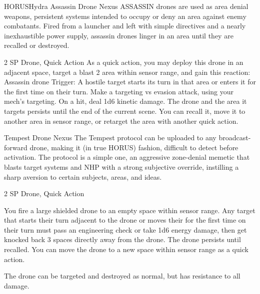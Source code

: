 \begin{mech}{HORUS}{Hydra}
Assassin Drone Nexus
ASSASSIN drones are used as area denial weapons, persistent systems intended to occupy or deny an area against enemy combatants. Fired from a launcher and left with simple directives and a nearly inexhaustible power supply, assassin drones linger in an area until they are recalled or destroyed.

2 SP
Drone, Quick Action
As a quick action, you may deploy this drone in an adjacent space, target a blast 2 area within sensor range, and gain this reaction:
Assassin drone
Trigger: A hostile target starts its turn in that area or enters it for the first time on their turn. Make a targeting vs evasion attack, using your mech's targeting. On a hit, deal 1d6 kinetic damage.
The drone and the area it targets persists until the end of the current scene. You can recall it, move it to another area in sensor range, or retarget the area with another quick action.

Tempest Drone Nexus
The Tempest protocol can be uploaded to any broadcast-forward drone, making it (in true HORUS) fashion, difficult to detect before activation. The protocol is a simple one, an aggressive zone-denial memetic that blasts target systems and NHP with a strong subjective override, instilling a sharp aversion to certain subjects, areas, and ideas.

2 SP
Drone, Quick Action

You fire a large shielded drone to an empty space within sensor range. Any target that starts their turn adjacent to the drone or moves their for the first time on their turn must pass an engineering check or take 1d6 energy damage, then get knocked back 3 spaces directly away from the drone. The drone persists until recalled. You can move the drone to a new space within sensor range as a quick action.

The drone can be targeted and destroyed as normal, but has resistance to all damage.


\end{mech}
